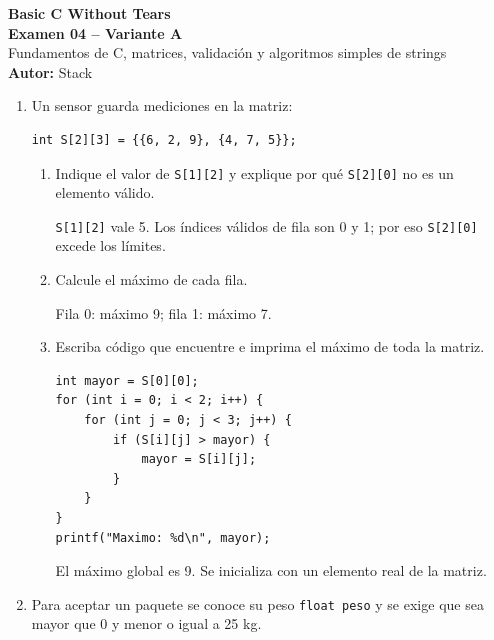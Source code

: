 
\newcommand{\NombreDocumento}{Examen 04 -- Variante A}

\begin{center}
    {\LARGE \textbf{Basic C Without Tears}} \\[0.2cm]
    {\Large \textbf{Examen 04 -- Variante A}} \\[0.12cm]
    \small Fundamentos de C, matrices, validación y algoritmos simples de strings \\[0.08cm]
    \textbf{Autor:} Stack
\end{center}
\vspace{0.2cm}
\begin{enumerate}[label=\textbf{\arabic*.}]
\item Un sensor guarda mediciones en la matriz:
\begin{lstlisting}[style=customc, numbers=none]
int S[2][3] = {{6, 2, 9}, {4, 7, 5}};
\end{lstlisting}
\begin{enumerate}[label=(\alph*)]
\item Indique el valor de \texttt{S[1][2]} y explique por qué \texttt{S[2][0]} no es un elemento válido.
\ifpauta\begin{solucionbox}\texttt{S[1][2]} vale 5. Los índices válidos de fila son 0 y 1; por eso \texttt{S[2][0]} excede los límites.\end{solucionbox}\else\vspace{1.5cm}\fi
\item Calcule el máximo de cada fila.
\ifpauta\begin{solucionbox}Fila 0: máximo 9; fila 1: máximo 7.\end{solucionbox}\else\vspace{2cm}\fi
\item Escriba código que encuentre e imprima el máximo de toda la matriz.
\ifpauta\begin{solucionbox}\begin{lstlisting}[style=customc]
int mayor = S[0][0];
for (int i = 0; i < 2; i++) {
    for (int j = 0; j < 3; j++) {
        if (S[i][j] > mayor) {
            mayor = S[i][j];
        }
    }
}
printf("Maximo: %d\n", mayor);
\end{lstlisting}El máximo global es 9. Se inicializa con un elemento real de la matriz.\end{solucionbox}\else\vspace{3cm}\fi
\end{enumerate}
\newpage
\item Para aceptar un paquete se conoce su peso \texttt{float peso} y se exige que sea mayor que 0 y menor o igual a 25 kg.

\end{enumerate}
